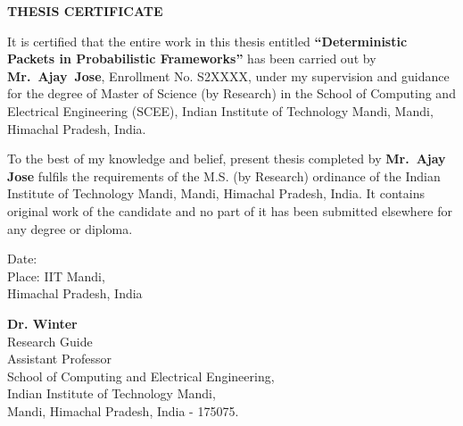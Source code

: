 \thispagestyle{empty}
\vspace*{2cm}
\centerline{\Large \bf THESIS CERTIFICATE}
\vspace*{2cm}

It is certified that the entire work in this thesis entitled \textbf{``Deterministic Packets in Probabilistic Frameworks''} 
has been carried out by \textbf{Mr.~Ajay~Jose}, Enrollment No. S2XXXX, 
under my supervision and guidance for the degree of Master of Science (by Research) in the School
of Computing and Electrical Engineering (SCEE), Indian Institute of
Technology Mandi, Mandi, Himachal Pradesh, India.

To the best of my knowledge and belief, present thesis completed by 
\textbf{Mr.~Ajay Jose} fulfils the requirements of the M.S. (by Research) 
ordinance of the Indian Institute of Technology Mandi, Mandi, Himachal Pradesh, 
India. It contains original work of the candidate and no part of it has been
 submitted elsewhere for any degree or diploma. \\[1.25cm]


\noindent \begin{minipage}[c]{0.4\columnwidth}
Date: \\
Place: IIT Mandi, \\
Himachal Pradesh, India
\end{minipage}
\noindent \begin{minipage}[c]{0.6\columnwidth}
\begin{flushright}
	\textbf{Dr. Winter}\\
    Research Guide\\
    Assistant Professor\\
    School of Computing and Electrical Engineering,\\
    Indian Institute of Technology Mandi,\\
    Mandi, Himachal Pradesh, India - 175075.
\end{flushright}
\end{minipage}
